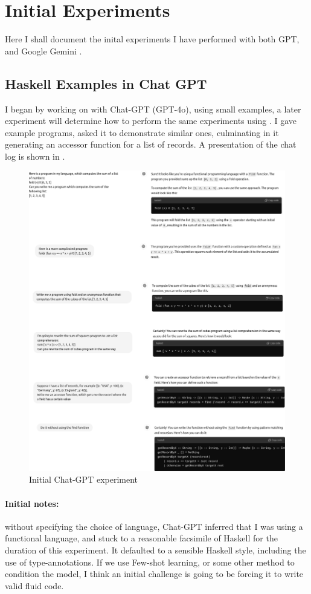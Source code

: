 \section{Initial Experiments}
Here I shall document the inital experiments I have performed with both GPT, and
Google Gemini \citet{gemini2023}. 

\subsection{Haskell Examples in Chat GPT}
I began by working on with Chat-GPT (GPT-4o), using small examples, a later
experiment will determine how to perform the same experiments using .
I gave example programs, asked it to demonstrate similar ones, culminating in it
generating an accessor function for a list of records. A presentation of the chat
log is shown in . 

\begin{figure}
   \includegraphics{fig/chat-gpt-experiment.png}
   \caption{Initial Chat-GPT experiment}
   \label{fig:chatgpt-experiment}
\end{figure}

\paragraph*{Initial notes: } without specifying the choice of language, 
Chat-GPT inferred that I was using a functional language, and stuck to 
a reasonable facsimile of Haskell for the duration of this experiment. 
It defaulted to a sensible Haskell style, including the use of type-annotations.
If we use Few-shot learning, or some other method to condition the model, I think
an initial challenge is going to be forcing it to write valid fluid code. 